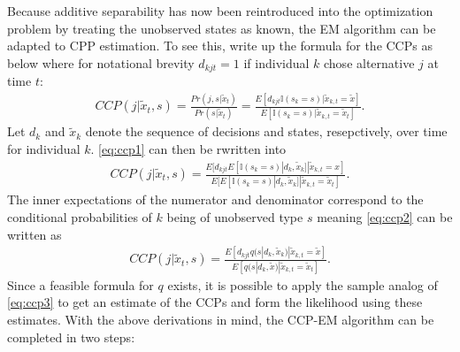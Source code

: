 Because additive separability has now been reintroduced into the optimization problem by treating the unobserved states as known, the EM algorithm can be adapted to CPP estimation. To see this, write up the formula for the CCPs as below where for notational brevity $d_{kjt}=1$ if individual $k$ chose alternative $j$ at time $t$:
\begin{align}
CCP(j|\tilde{x}_{t},s)=\frac{Pr(j,s|\tilde{x}_{t})}{Pr(s|\tilde{x}_{t})}=\frac{E[d_{kjt}\mathbb{I}({s_k=s})|\tilde{x}_{k,t}=\tilde{x}]}{E[\mathbb{I}({s_k=s})|\tilde{x}_{k,t}=\tilde{x}_t]}.
\label{eq:ccp1}
\end{align}
Let $d_k$ and $\tilde{x}_k$ denote the sequence of decisions and states, resepctively, over time for individual $k$. \eqref{eq:ccp1} can then be rwritten into 
\begin{align}
CCP(j|\tilde{x}_t,s)=\frac{E[d_{kjt}E[\mathbb{I}{(s_k=s)}|d_k,\tilde{x}_k]|\tilde{x}_{k,t}=x]}{E[E[\mathbb{I}{(s_k=s)}|d_k,\tilde{x}_k]|\tilde{x}_{k,t}=\tilde{x}_t]}.
\label{eq:ccp2}
\end{align}
The inner expectations of the numerator and denominator correspond to the conditional probabilities of $k$ being of unobserved type $s$ meaning \eqref{eq:ccp2} can be written as
\begin{align}
CCP(j|\tilde{x}_t,s)=\frac{E[d_{kjt}q(s|d_k,\tilde{x}_k)|\tilde{x}_{k,t}=\tilde{x}]}{E[q(s|d_k,\tilde{x})|\tilde{x}_{k,t}=\tilde{x}_t]}.
\label{eq:ccp3}
\end{align}
Since a feasible formula for $q$ exists, it is possible to apply the sample analog of \eqref{eq:ccp3} to get an estimate of the CCPs and form the likelihood using these estimates. 
With the above derivations in mind, the CCP-EM algorithm can be completed in two steps:


